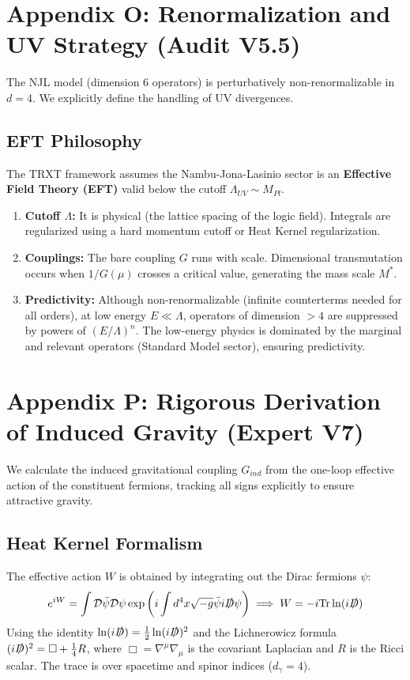 \documentclass[a4paper,12pt]{article}
\begin{document}
\section{Appendix O: Renormalization and UV Strategy (Audit V5.5)}

The NJL model (dimension 6 operators) is perturbatively non-renormalizable in $d=4$. We explicitly define the handling of UV divergences.

\subsection{EFT Philosophy}
The TRXT framework assumes the Nambu-Jona-Lasinio sector is an \textbf{Effective Field Theory (EFT)} valid below the cutoff $\Lambda_{UV} \sim M_{Pl}$.
\begin{enumerate}
    \item \textbf{Cutoff $\Lambda$:} It is physical (the lattice spacing of the logic field). Integrals are regularized using a hard momentum cutoff or Heat Kernel regularization.
    \item \textbf{Couplings:} The bare coupling $G$ runs with scale. Dimensional transmutation occurs when $1/G(\mu)$ crosses a critical value, generating the mass scale $M^*$.
    \item \textbf{Predictivity:} Although non-renormalizable (infinite counterterms needed for all orders), at low energy $E \ll \Lambda$, operators of dimension $>4$ are suppressed by powers of $(E/\Lambda)^n$. The low-energy physics is dominated by the marginal and relevant operators (Standard Model sector), ensuring predictivity.
\end{enumerate}

\section{Appendix P: Rigorous Derivation of Induced Gravity (Expert V7)}

We calculate the induced gravitational coupling $G_{ind}$ from the one-loop effective action of the constituent fermions, tracking all signs explicitly to ensure attractive gravity.

\subsection{Heat Kernel Formalism}
The effective action $W$ is obtained by integrating out the Dirac fermions $\psi$:
\begin{equation}
    e^{iW} = \int \mathcal{D}\bar{\psi}\mathcal{D}\psi \exp\left( i \int d^4x \sqrt{-g} \bar{\psi} i \slashed{D} \psi \right) \implies W = -i \text{Tr} \ln (i\slashed{D})
\end{equation}
Using the identity $\ln (i\slashed{D}) = \frac{1}{2} \ln (i\slashed{D})^2$ and the Lichnerowicz formula $(i\slashed{D})^2 = \Box + \frac{1}{4}R$, where $\Box = \nabla^\mu \nabla_\mu$ is the covariant Laplacian and $R$ is the Ricci scalar. The trace is over spacetime and spinor indices ($d_\gamma = 4$).
\end{document}
